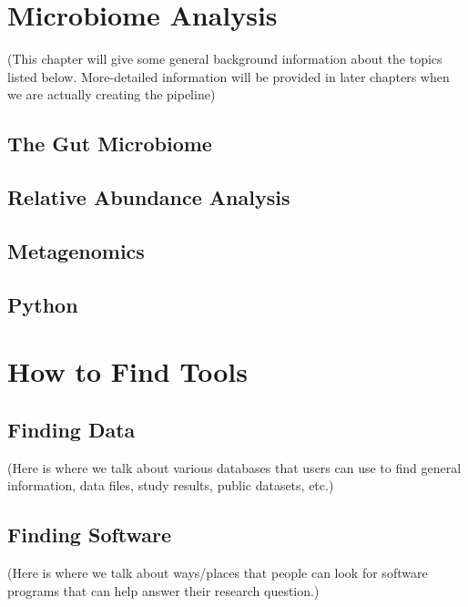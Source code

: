 \chapter{Microbiome Analysis}
(This chapter will give some general background information about the topics listed below. More-detailed information will be provided in later chapters when we are actually creating the pipeline)
\section{The Gut Microbiome}
\section{Relative Abundance Analysis}
\section{Metagenomics}
\section{Python}

\chapter{How to Find Tools}
    \label{chap:find-tools}
\section{Finding Data}
(Here is where we talk about various databases that users can use to find general information, data files, study results, public datasets, etc.)
\section{Finding Software}
(Here is where we talk about ways/places that people can look for software programs that can help answer their research question.)
